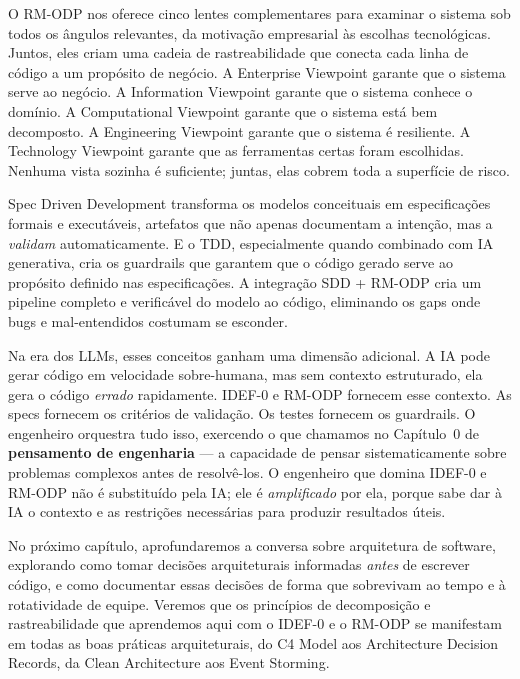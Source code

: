 O RM-ODP nos oferece cinco lentes complementares para examinar o sistema sob todos
os ângulos relevantes, da motivação empresarial às escolhas tecnológicas. Juntos,
eles criam uma cadeia de rastreabilidade que conecta cada linha de código a
um propósito de negócio. A Enterprise Viewpoint garante que o sistema serve ao
negócio. A Information Viewpoint garante que o sistema conhece o domínio. A
Computational Viewpoint garante que o sistema está bem decomposto. A Engineering
Viewpoint garante que o sistema é resiliente. A Technology Viewpoint garante que
as ferramentas certas foram escolhidas. Nenhuma vista sozinha é suficiente; juntas,
elas cobrem toda a superfície de risco.

Spec Driven Development transforma os modelos conceituais em especificações
formais e executáveis, artefatos que não apenas documentam a intenção, mas
a \emph{validam} automaticamente. E o TDD, especialmente quando combinado com
IA generativa, cria os guardrails que garantem que o código gerado serve ao
propósito definido nas especificações. A integração SDD + RM-ODP cria um
pipeline completo e verificável do modelo ao código, eliminando os gaps onde
bugs e mal-entendidos costumam se esconder.

Na era dos LLMs, esses conceitos ganham uma dimensão adicional. A IA pode
gerar código em velocidade sobre-humana, mas sem contexto estruturado, ela
gera o código \emph{errado} rapidamente. IDEF-0 e RM-ODP fornecem esse
contexto. As specs fornecem os critérios de validação. Os testes fornecem
os guardrails. O engenheiro orquestra tudo isso, exercendo o que chamamos no
Capítulo~0 de \textbf{pensamento de engenharia} --- a capacidade de pensar
sistematicamente sobre problemas complexos antes de resolvê-los. O engenheiro
que domina IDEF-0 e RM-ODP não é substituído pela IA; ele é \emph{amplificado}
por ela, porque sabe dar à IA o contexto e as restrições necessárias para
produzir resultados úteis.

No próximo capítulo, aprofundaremos a conversa sobre arquitetura de software,
explorando como tomar decisões arquiteturais informadas \emph{antes} de
escrever código, e como documentar essas decisões de forma que sobrevivam
ao tempo e à rotatividade de equipe. Veremos que os princípios de decomposição
e rastreabilidade que aprendemos aqui com o IDEF-0 e o RM-ODP se manifestam
em todas as boas práticas arquiteturais, do C4 Model aos Architecture Decision
Records, da Clean Architecture aos Event Storming.


